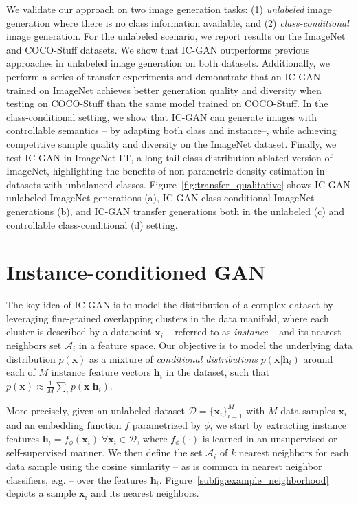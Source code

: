 We validate our approach on two image generation tasks: (1) \emph{unlabeled} image generation where there is no class information available, and (2) \emph{class-conditional} image generation. For the unlabeled scenario, we report results on the ImageNet and COCO-Stuff datasets. We show that {IC-GAN} outperforms  previous approaches in unlabeled image generation on both datasets. Additionally, we perform a series of transfer experiments and demonstrate that an {IC-GAN} trained on ImageNet achieves better generation quality and diversity when testing on COCO-Stuff than the same model trained on COCO-Stuff. In the class-conditional setting, we show that {IC-GAN} can generate images with controllable semantics -- by adapting both class and instance--, while achieving competitive sample quality and diversity on the ImageNet dataset. Finally, we test {IC-GAN} in ImageNet-LT, a long-tail class distribution ablated version of ImageNet, highlighting the benefits of non-parametric density estimation in datasets with unbalanced classes. Figure~\ref{fig:transfer_qualitative} shows {IC-GAN} unlabeled ImageNet generations (a), {IC-GAN} class-conditional ImageNet generations (b), and {IC-GAN} transfer generations both in the unlabeled (c) and controllable class-conditional (d) setting.

\section{Instance-conditioned GAN}

The key idea of {IC-GAN} is to model the distribution of a complex dataset by leveraging fine-grained overlapping clusters in the data manifold, where each cluster is described by a datapoint $\mathbf{x}_i$ -- referred to as \emph{instance} -- and its nearest neighbors set $\mathcal{A}_i$ in a feature space. Our objective is to model the underlying data distribution $p(\mathbf{x})$ as a mixture of \textit{conditional distributions} $p(\mathbf{x}|\mathbf{h}_i)$ around each of $M$ instance feature vectors $\mathbf{h}_i$ in the dataset, such that $p(\mathbf{x}) \approx \frac{1}{M}\sum_i p(\mathbf{x}|\mathbf{h}_i)$.

More precisely, given an unlabeled dataset $\mathcal{D} = \{\mathbf{x}_i\}_{i=1}^M$ with $M$ data samples $\mathbf{x}_i$ and an embedding function $f$ parametrized by $\phi$, we start by extracting instance features $\mathbf{h}_i=f_{\phi}(\mathbf{x}_i) \; \forall \mathbf{x}_i \in \mathcal{D}$, where $f_{\phi}(\cdot)$ is learned in an unsupervised or self-supervised manner. We then define the set $\mathcal{A}_i$ of $k$ nearest neighbors for each data sample using the cosine similarity -- as is common in nearest neighbor classifiers, e.g. \cite{touvron20arxiv,vinyals16nips} -- over the features $\mathbf{h}_i$. Figure~\ref{subfig:example_neighborhood} depicts a sample $\mathbf{x}_i$ and its  nearest neighbors. 

